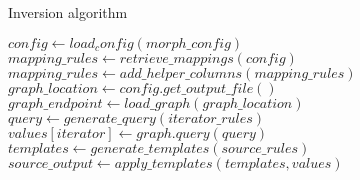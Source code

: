 \begin{algorithm}
    \caption{Inversion algorithm}
    \label{alg:inversion}
    \begin{algorithmic}[1]
        \State $config \gets load_config(morph\_config)$
        \State $mapping\_rules \gets retrieve\_mappings(config)$
        \State $mapping\_rules \gets add\_helper\_columns(mapping\_rules)$
        \State $graph\_location \gets config.get\_output\_file()$
        \State $graph\_endpoint \gets load\_graph(graph\_location)$
                \State $query \gets generate\_query(iterator\_rules)$
                \State $values[iterator] \gets graph.query(query)$
            \EndFor
            \State $templates \gets generate\_templates(source\_rules)$
            \State $source\_output \gets apply\_templates(templates, values)$
        \EndFor
    \end{algorithmic}
\end{algorithm}

